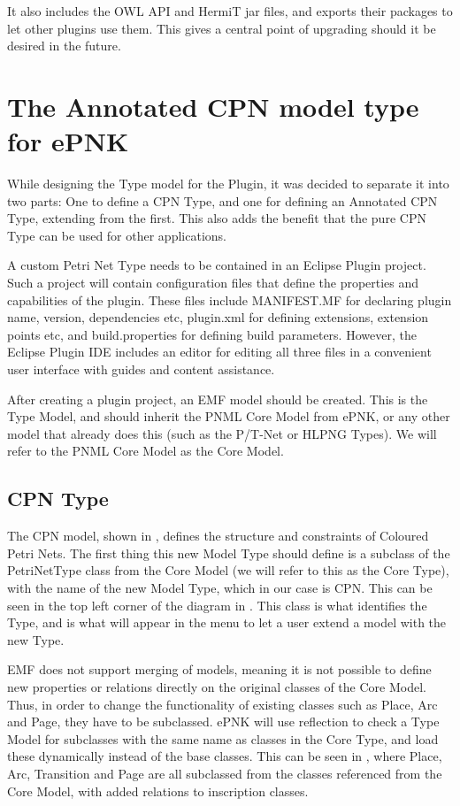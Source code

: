It also includes the OWL API and HermiT jar files, and exports their packages to
let other plugins use them. This gives a central point of upgrading should it be
desired in the future.

\section{The Annotated CPN model type for ePNK}
While designing the Type model for the Plugin, it was decided to separate it
into two parts: One to define a CPN Type, and one for defining an Annotated CPN
Type, extending from the first. This also adds the benefit that the pure CPN
Type can be used for other applications.

A custom Petri Net Type needs to be contained in an Eclipse Plugin project.
Such a project will contain configuration files that define the properties and
capabilities of the plugin. These files include MANIFEST.MF for declaring plugin
name, version, dependencies etc, plugin.xml for defining extensions, extension
points etc, and build.properties for defining build parameters. However, the
Eclipse Plugin IDE includes an editor for editing all three files in a
convenient user interface with guides and content assistance.

After creating a plugin project, an EMF model should be created. This is the
Type Model, and should inherit the PNML Core Model from ePNK, or any other model
that already does this (such as the P/T-Net or HLPNG Types).  We will refer to the PNML Core Model as the Core
Model.

\subsection{CPN Type}
The CPN model, shown in , defines the structure and
constraints of Coloured Petri Nets. The first thing this new Model Type should
define is a subclass of the PetriNetType class from the Core Model (we will
refer to this as the Core Type), with the name of the new Model Type, which in
our case is CPN. This can be seen in the top left corner of the diagram in
. This class is what identifies the Type, and is what
will appear in the menu to let a user extend a model with the new Type.


EMF does not support merging of models, meaning it is not possible to define new
properties or relations directly on the original classes of the Core Model.
Thus, in order to change the functionality of existing classes such as Place,
Arc and Page, they have to be subclassed. ePNK will use reflection to check a
Type Model for subclasses with the same name as classes in the Core Type, and
load these dynamically instead of the base classes.
This can be seen in , where Place, Arc, Transition and
Page are all subclassed from the classes referenced from the Core Model, with
added relations to inscription classes.

